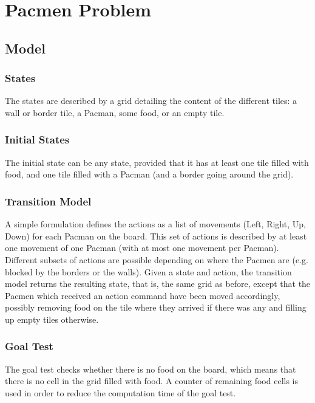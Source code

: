 \documentclass[journal]{IEEEtran}
\begin{document}
\section{Pacmen Problem}
\subsection{Model}
\subsubsection{States}
The states are described by a grid detailing the content of the different tiles: a wall or border tile, a Pacman, some food, or an empty tile.
\subsubsection{Initial States}
The initial state can be any state, provided that it has at least one tile filled with food, and one tile filled with a Pacman (and a border going around the grid).

\subsubsection{Transition Model}
A simple formulation defines the actions as a list of movements (Left, Right, Up, Down) for each Pacman on the board.
This set of actions is described by at least one movement of one Pacman (with at most one movement per Pacman).
Different subsets of actions are possible depending on where the Pacmen are (e.g. blocked by the borders or the walls). 
Given a state and action, the transition model returns the resulting state, that is, the same grid as before, except that the Pacmen which received an action command have been moved accordingly, possibly removing food on the tile where they arrived if there was any and filling up empty tiles otherwise.

\subsubsection{Goal Test}
The goal test checks whether there is no food on the board, which means that there is no cell in the grid filled with food.
A counter of remaining food cells is used in order to reduce the computation time of the goal test.
\end{document}
